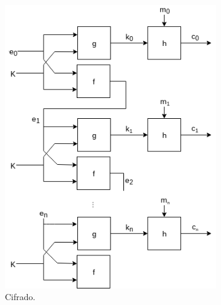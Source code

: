 \begin{figure}
  \centering
  \begin{subfigure}{0.45\textwidth}
    \begin{center}
      \includegraphics[width=0.9\linewidth]{diagramas/sincrono_cifrado.png}
      \caption{Cifrado.}
    \end{center}
  \end{subfigure}
  \begin{subfigure}{0.45\textwidth}
    \begin{center}

\end{center}
\end{subfigure}
\end{figure}
